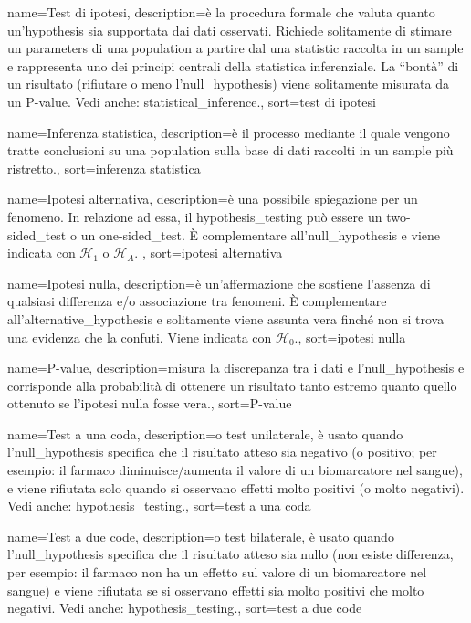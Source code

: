 {
	 name={Test di ipotesi},
	 description={\`e la procedura formale che valuta quanto un'\gls{hypothesis} sia supportata dai dati osservati. Richiede solitamente di stimare un \gls{parameters} di una \gls{population} a partire dal una \gls{statistic} raccolta in un \gls{sample} e rappresenta uno dei principi centrali della statistica inferenziale. La ``bont\`a'' di un risultato (rifiutare o meno l'\gls{null_hypothesis}) viene solitamente misurata da un \gls{P-value}. Vedi anche: \gls{statistical_inference}.},
	 sort={test di ipotesi}
}

{
	 name={Inferenza statistica},
	 description={\`e il processo mediante il quale vengono tratte conclusioni su una \gls{population} sulla base di dati raccolti in un \gls{sample} pi\`u ristretto.},
	 sort={inferenza statistica}
}

{
	 name={Ipotesi alternativa},
	 description={\`e una possibile spiegazione per un fenomeno. In relazione ad essa, il \gls{hypothesis_testing} pu\`o essere un \gls{two-sided_test} o un \gls{one-sided_test}. \`E complementare all'\gls{null_hypothesis} e viene indicata con $\mathcal{H}_1 \text{ o } \mathcal{H}_A$. },
	 sort={ipotesi alternativa}
}

{
	 name={Ipotesi nulla},
	 description={\`e un'affermazione che sostiene l'assenza di qualsiasi differenza e/o associazione tra fenomeni. \`E complementare all'\gls{alternative_hypothesis} e solitamente viene assunta vera finché non si trova una evidenza che la confuti. Viene indicata con $\mathcal{H}_0$.},
	 sort={ipotesi nulla}
}

{
	 name={P-value},
	 description={misura la discrepanza tra i dati e l'\gls{null_hypothesis} e corrisponde alla probabilit\`a di ottenere un risultato tanto estremo quanto quello ottenuto se l'ipotesi nulla fosse vera.},
	 sort={P-value}
}

{
	 name={Test a una coda},
	 description={o test unilaterale, \`e usato quando l'\gls{null_hypothesis} specifica che il risultato atteso sia negativo (o positivo; per esempio: il farmaco diminuisce/aumenta il valore di un biomarcatore nel sangue), e viene rifiutata solo quando si osservano effetti molto positivi (o molto negativi). Vedi anche: \gls{hypothesis_testing}.},
	 sort={test a una coda}
}

{
	 name={Test a due code},
	 description={o test bilaterale, \`e usato quando l'\gls{null_hypothesis} specifica che il risultato atteso sia nullo (non esiste differenza, per esempio: il farmaco non ha un effetto sul valore di un biomarcatore nel sangue) e viene rifiutata se si osservano effetti sia molto positivi che molto negativi. Vedi anche: \gls{hypothesis_testing}.},
	 sort={test a due code}
}

